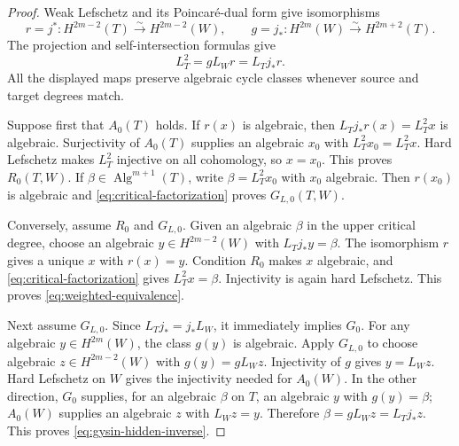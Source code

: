 \documentclass[11pt,a4paper]{article}
\theoremstyle{definition}
\theoremstyle{remark}
\begin{document}
\begin{proof}
Weak Lefschetz and its Poincar\'e-dual form give isomorphisms
\[
 r=j^*:H^{2m-2}(T)\xrightarrow{\sim}H^{2m-2}(W),\qquad
 g=j_*:H^{2m}(W)\xrightarrow{\sim}H^{2m+2}(T).
\]
The projection and self-intersection formulas give
\begin{equation}
 L_T^2=gL_Wr=L_Tj_*r.
 \label{eq:critical-factorization}
\end{equation}
All the displayed maps preserve algebraic cycle classes whenever
source and target degrees match.

Suppose first that $A_0(T)$ holds.  If $r(x)$ is algebraic, then
$L_Tj_*r(x)=L_T^2x$ is algebraic.  Surjectivity of $A_0(T)$ supplies
an algebraic $x_0$ with $L_T^2x_0=L_T^2x$.  Hard Lefschetz makes
$L_T^2$ injective on all cohomology, so $x=x_0$.  This proves
$R_0(T,W)$.  If $\beta\in\operatorname{Alg}^{m+1}(T)$, write
$\beta=L_T^2x_0$ with $x_0$ algebraic.  Then $r(x_0)$ is algebraic
and \eqref{eq:critical-factorization} proves $G_{L,0}(T,W)$.

Conversely, assume $R_0$ and $G_{L,0}$.  Given an algebraic
$\beta$ in the upper critical degree, choose an algebraic
$y\in H^{2m-2}(W)$ with $L_Tj_*y=\beta$.  The isomorphism $r$
gives a unique $x$ with $r(x)=y$.  Condition $R_0$ makes $x$
algebraic, and \eqref{eq:critical-factorization} gives
$L_T^2x=\beta$.  Injectivity is again hard Lefschetz.  This proves
\eqref{eq:weighted-equivalence}.

Next assume $G_{L,0}$.  Since $L_Tj_*=j_*L_W$, it immediately
implies $G_0$.  For any algebraic $y\in H^{2m}(W)$, the class
$g(y)$ is algebraic.  Apply $G_{L,0}$ to choose algebraic
$z\in H^{2m-2}(W)$ with $g(y)=gL_Wz$.  Injectivity of $g$ gives
$y=L_Wz$.  Hard Lefschetz on $W$ gives the injectivity needed for
$A_0(W)$.  In the other direction, $G_0$ supplies, for an algebraic
$\beta$ on $T$, an algebraic $y$ with $g(y)=\beta$; $A_0(W)$
supplies an algebraic $z$ with $L_Wz=y$.  Therefore
$\beta=gL_Wz=L_Tj_*z$.  This proves
\eqref{eq:gysin-hidden-inverse}.
\end{proof}
\end{document}

